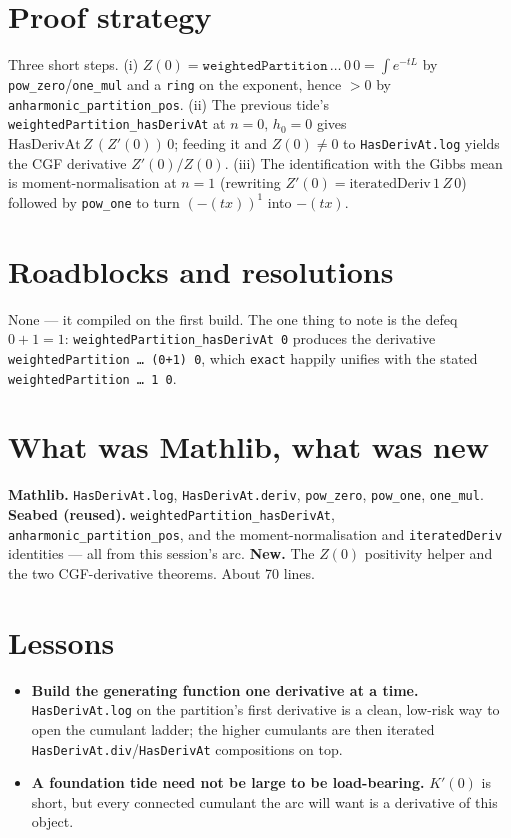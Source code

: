\documentclass[11pt]{article}
\begin{document}
\section{Proof strategy}

Three short steps. (i) $Z(0)=\texttt{weightedPartition}\,\dots\,0\,0=\int e^{-tL}$
by \texttt{pow\_zero}/\texttt{one\_mul} and a \texttt{ring} on the exponent,
hence $>0$ by \texttt{anharmonic\_partition\_pos}. (ii) The previous tide's
\texttt{weightedPartition\_hasDerivAt} at $n=0,\,h_0=0$ gives
$\mathrm{HasDerivAt}\,Z\,(Z'(0))\,0$; feeding it and $Z(0)\neq0$ to
\texttt{HasDerivAt.log} yields the CGF derivative $Z'(0)/Z(0)$. (iii) The
identification with the Gibbs mean is moment-normalisation at $n=1$
(rewriting $Z'(0)=\mathrm{iteratedDeriv}\,1\,Z\,0$) followed by \texttt{pow\_one}
to turn $(-(tx))^1$ into $-(tx)$.

\section{Roadblocks and resolutions}

None --- it compiled on the first build. The one thing to note is the
defeq $0+1=1$: \texttt{weightedPartition\_hasDerivAt 0} produces the derivative
\texttt{weightedPartition \dots\ (0+1) 0}, which \texttt{exact} happily unifies
with the stated \texttt{weightedPartition \dots\ 1 0}.

\section{What was Mathlib, what was new}

\textbf{Mathlib.} \texttt{HasDerivAt.log}, \texttt{HasDerivAt.deriv},
\texttt{pow\_zero}, \texttt{pow\_one}, \texttt{one\_mul}.
\textbf{Seabed (reused).} \texttt{weightedPartition\_hasDerivAt},
\texttt{anharmonic\_partition\_pos}, and the moment-normalisation and
\texttt{iteratedDeriv} identities --- all from this session's arc.
\textbf{New.} The $Z(0)$ positivity helper and the two CGF-derivative theorems.
About 70 lines.

\section{Lessons}

\begin{itemize}[itemsep=3pt]
\item \textbf{Build the generating function one derivative at a time.}
  \texttt{HasDerivAt.log} on the partition's first derivative is a clean,
  low-risk way to open the cumulant ladder; the higher cumulants are then
  iterated \texttt{HasDerivAt.div}/\texttt{HasDerivAt} compositions on top.
\item \textbf{A foundation tide need not be large to be load-bearing.} $K'(0)$
  is short, but every connected cumulant the arc will want is a derivative of
  this object.
\end{itemize}
\end{document}
